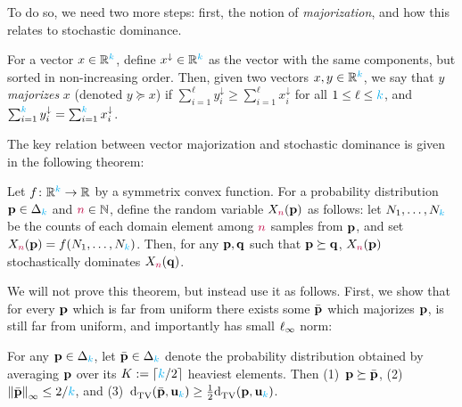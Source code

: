 To do so, we need two more steps: first, the notion of \emph{majorization}, and how this relates to stochastic dominance.
\begin{definition}
For a vector $x\in \R^\ab$, define $x^{\downarrow}\in\R^\ab$ as the vector with the same components, but sorted in non-increasing order. Then, given two vectors $x,y\in\R^\ab$, we say that $y$ \emph{majorizes} $x$ (denoted $y\succeq x$) if $\sum_{i=1}^\ell y^{\downarrow}_i \geq \sum_{i=1}^\ell x^{\downarrow}_i$ for all $1\leq \ell\leq \ab$, and $\sum_{i=1}^\ab y^{\downarrow}_i = \sum_{i=1}^\ab x^{\downarrow}_i$.
\end{definition}
The key relation between vector majorization and stochastic dominance is given in the following theorem:
\begin{theorem}
  \label{theo:stochdominance:symmetricfunction}
  Let $f\colon \R^\ab\to\R$ by a symmetrix convex function. For a probability distribution $\p\in\distribs{\ab}$ and $\ns\in\N$, define the random variable $X_\ns(\p)$ as follows: let $N_1,\dots,N_\ab$ be the counts of each domain element among $\ns$ \iid samples from $\p$, and set $X_\ns(\p)=f(N_1,\dots,N_\ab)$. Then, for any $\p,\q$ such that $\p\succeq\q$, $X_\ns(\p)$ stochastically dominates $X_\ns(\q)$.
\end{theorem}
We will not prove this theorem, but instead use it as follows. First, we show that for every $\p$ which is far from uniform there exists some $\bar{\p}$ which majorizes $\p$, is still far from uniform, and importantly has small $\lp[\infty]$ norm: 
\begin{lemma}
  \label{lemma:distance:uniformity:averaging}
For any $\p\in\distribs{\ab}$, let $\bar{\p}\in\distribs{\ab}$ denote the probability distribution obtained by averaging $\p$ over its $K\eqdef \clg{\ab/2}$ heaviest elements. Then (1)~$\p\succeq \bar{\p}$, (2)~$\norminf{\bar{\p}}\leq 2/\ab$, and (3)~$\totalvardist{\bar{\p}}{\uniform_\ab}\geq \frac{1}{2}\totalvardist{\p}{\uniform_\ab}$.
\end{lemma}
